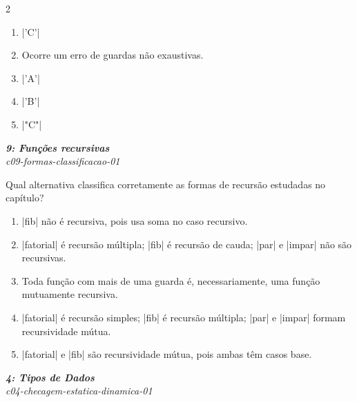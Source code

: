 \documentclass[a4paper,10pt,brazil]{article}
\begin{document}
\begin{multicols}{2}
\begin{enumerate}
  \item \haskellinline|'C'|

  \item Ocorre um erro de guardas não exaustivas.

  \item \haskellinline|'A'|

  \item \haskellinline|'B'|

  \item \haskellinline|"C"|


\end{enumerate}

\begin{flushright}
  \footnotesize
  \textit{\textbf{9: Funções recursivas}}\\
  \textit{c09-formas-classificacao-01}\\

\end{flushright}
Qual alternativa classifica corretamente as formas de recursão estudadas no capítulo?

\begin{enumerate}
  \item \haskellinline|fib| não é recursiva, pois usa soma no caso recursivo.

  \item \haskellinline|fatorial| é recursão múltipla; \haskellinline|fib| é recursão de cauda; \haskellinline|par| e \haskellinline|impar| não são recursivas.

  \item Toda função com mais de uma guarda é, necessariamente, uma função mutuamente recursiva.

  \item \haskellinline|fatorial| é recursão simples; \haskellinline|fib| é recursão múltipla; \haskellinline|par| e \haskellinline|impar| formam recursividade mútua.

  \item \haskellinline|fatorial| e \haskellinline|fib| são recursividade mútua, pois ambas têm casos base.


\end{enumerate}

\begin{flushright}
  \footnotesize
  \textit{\textbf{4: Tipos de Dados}}\\
  \textit{c04-checagem-estatica-dinamica-01}\\


\end{flushright}
\end{multicols}
\end{document}
